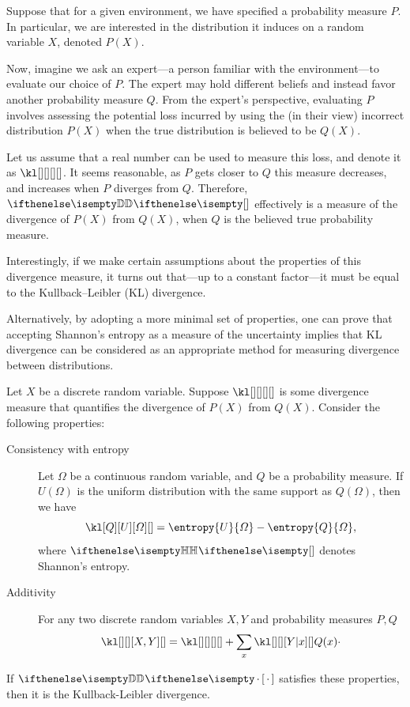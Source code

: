 Suppose that for a given environment, we have specified a probability measure $P$.
In particular, we are interested in the distribution it induces on a random variable $X$, denoted $P(X)$.

Now, imagine we ask an expert---a person familiar with the environment---to evaluate our choice of $P$.
The expert may hold different beliefs and instead favor another probability measure $Q$.
From the expert’s perspective, evaluating $P$ involves assessing the potential loss incurred by using
the (in their view) incorrect distribution $P(X)$ when the true distribution is believed to be $Q(X)$.

Let us assume that a real number can be used to measure this loss, and denote it as $\kl[][][][ ]$.
It seems reasonable, as $P$ gets closer to $Q$ this measure decreases, and increases when $P$ diverges from $Q$.
Therefore, $\measure{D}{}{}$ effectively is a measure of the divergence of $P(X)$ from $Q(X)$, when $Q$ is
the believed true probability measure.

Interestingly, if we make certain assumptions about the properties of this divergence measure,
it turns out that---up to a constant factor---it must be equal to the Kullback–Leibler (KL) divergence.

Alternatively, by adopting a more minimal set of properties, one can prove that accepting Shannon’s entropy as a
measure of the uncertainty implies that KL divergence can be considered as an appropriate
method for measuring divergence between distributions.

\begin{theorem}
    Let $X$ be a discrete random variable.
    Suppose $\kl[][][][ ]$ is some divergence measure that quantifies the divergence of $P(X)$ from $Q(X)$.
    Consider the following properties:

    \begin{description}
        \item[Consistency with entropy] Let $\varOmega$ be a continuous random variable, and $Q$ be a probability
        measure.
        If $U(\varOmega)$ is the uniform distribution with the same support as $Q(\varOmega)$, then we have
        \[
            \kl[Q][U][\varOmega][ ] = \entropy{U}{\varOmega} - \entropy{Q}{\varOmega},
        \]
        where $\measure{H}{}{}$ denotes Shannon's entropy.
        \item[Additivity] For any two discrete random variables $X, Y$ and probability measures $P,Q$
        \[
            \kl[][][X, Y][ ] = \kl[][][][ ] + \sum_x \kl[][][Y|x][ ]Q(x)\cdot
        \]
    \end{description}
    If $\measure{D}{}{\none}$ satisfies these properties, then it is the Kullback-Leibler divergence.
\end{theorem}

